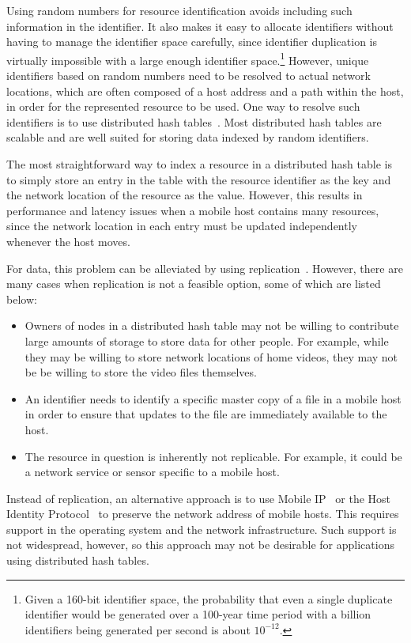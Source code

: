 \documentclass{article}
\begin{document}
Using random numbers for resource identification avoids including such
information in the identifier.  It also makes it easy to allocate
identifiers without having to manage the identifier space carefully,
since identifier duplication is virtually impossible with a large
enough identifier space.\footnote{Given a 160-bit identifier space,
  the probability that even a single duplicate identifier would be
  generated over a 100-year time period with a billion identifiers
  being generated per second is about $10^{-12}$.}  However, unique
identifiers based on random numbers need to be resolved to actual
network locations, which are often composed of a host address and a
path within the host, in order for the represented resource to be
used.  One way to resolve such identifiers is to use distributed hash
tables~\cite{androutsellis:survey2004,stoica:ton2003}.  Most
distributed hash tables are scalable and are well suited for storing
data indexed by random identifiers.

The most straightforward way to index a resource in a distributed hash
table is to simply store an entry in the table with the resource
identifier as the key and the network location of the resource as the
value.  However, this results in performance and latency issues when a
mobile host contains many resources, since the network location in
each entry must be updated independently whenever the host moves.

For data, this problem can be alleviated by using
replication~\cite{cfs,past}.  However, there are many cases when
replication is not a feasible option, some of which are listed below:

\begin{itemize}
\item Owners of nodes in a distributed hash table may not be willing
  to contribute large amounts of storage to store data for other
  people.  For example, while they may be willing to store network
  locations of home videos, they may not be be willing to store the
  video files themselves.
\item An identifier needs to identify a specific master copy of a file
  in a mobile host in order to ensure that updates to the file are
  immediately available to the host.
\item The resource in question is inherently not replicable.  For
  example, it could be a network service or sensor specific to a
  mobile host.
\end{itemize}

Instead of replication, an alternative approach is to use Mobile
IP~\cite{mobileip} or the Host Identity Protocol~\cite{rfc4423} to
preserve the network address of mobile hosts.  This requires support
in the operating system and the network infrastructure.  Such support
is not wide\-spread, however, so this approach may not be desirable
for applications using distributed hash tables.
\end{document}
